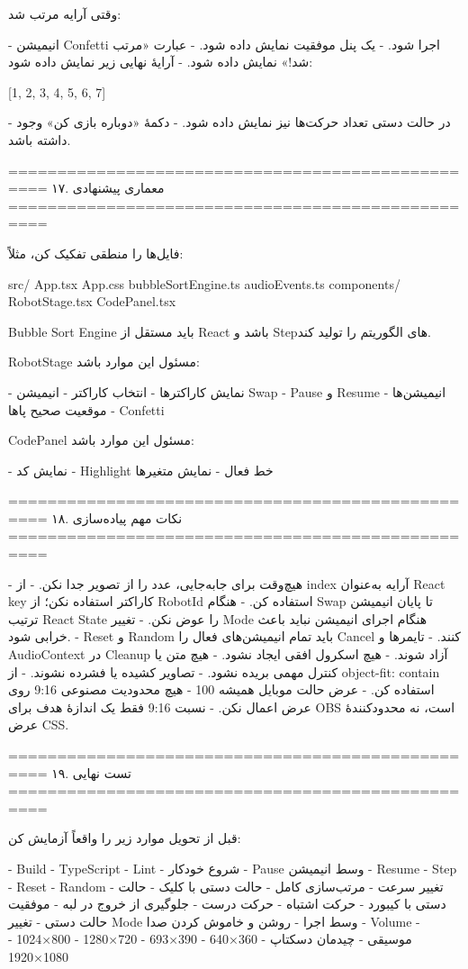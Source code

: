 وقتی آرایه مرتب شد:

- انیمیشن Confetti اجرا شود.
- یک پنل موفقیت نمایش داده شود.
- عبارت «مرتب شد!» نمایش داده شود.
- آرایهٔ نهایی زیر نمایش داده شود:

[1, 2, 3, 4, 5, 6, 7]

- در حالت دستی تعداد حرکت‌ها نیز نمایش داده شود.
- دکمهٔ «دوباره بازی کن» وجود داشته باشد.

==================================================
۱۷. معماری پیشنهادی
==================================================

فایل‌ها را منطقی تفکیک کن، مثلاً:

src/
  App.tsx
  App.css
  bubbleSortEngine.ts
  audioEvents.ts
  components/
    RobotStage.tsx
    CodePanel.tsx

Bubble Sort Engine باید مستقل از React باشد و Stepهای الگوریتم را تولید کند.

RobotStage مسئول این موارد باشد:

- نمایش کاراکترها
- انتخاب کاراکتر
- انیمیشن Swap
- Pause و Resume انیمیشن‌ها
- موقعیت صحیح پاها
- Confetti

CodePanel مسئول این موارد باشد:

- نمایش کد
- Highlight خط فعال
- نمایش متغیرها

==================================================
۱۸. نکات مهم پیاده‌سازی
==================================================

- هیچ‌وقت برای جابه‌جایی، عدد را از تصویر جدا نکن.
- از index آرایه به‌عنوان React key کاراکتر استفاده نکن؛ از RobotId استفاده کن.
- هنگام Swap تا پایان انیمیشن ترتیب React State را عوض نکن.
- تغییر Mode هنگام اجرای انیمیشن نباید باعث خرابی شود.
- Reset و Random باید تمام انیمیشن‌های فعال را Cancel کنند.
- تایمرها و AudioContext در Cleanup آزاد شوند.
- هیچ اسکرول افقی ایجاد نشود.
- هیچ متن یا کنترل مهمی بریده نشود.
- تصاویر کشیده یا فشرده نشوند.
- از object-fit: contain استفاده کن.
- عرض حالت موبایل همیشه 100%
- هیچ محدودیت مصنوعی 9:16 روی عرض اعمال نکن.
- نسبت 9:16 فقط یک اندازهٔ هدف برای OBS است، نه محدودکنندهٔ عرض CSS.

==================================================
۱۹. تست نهایی
==================================================

قبل از تحویل موارد زیر را واقعاً آزمایش کن:

- Build
- TypeScript
- Lint
- شروع خودکار
- Pause وسط انیمیشن
- Resume
- Step
- Reset
- Random
- تغییر سرعت
- مرتب‌سازی کامل
- حالت دستی با کلیک
- حالت دستی با کیبورد
- حرکت اشتباه
- حرکت درست
- جلوگیری از خروج در لبه
- موفقیت حالت دستی
- تغییر Mode وسط اجرا
- روشن و خاموش کردن صدا
- Volume
- موسیقی
- چیدمان دسکتاپ
- 360×640
- 390×693
- 720×1280
- 800×1024
- 1080×1920

